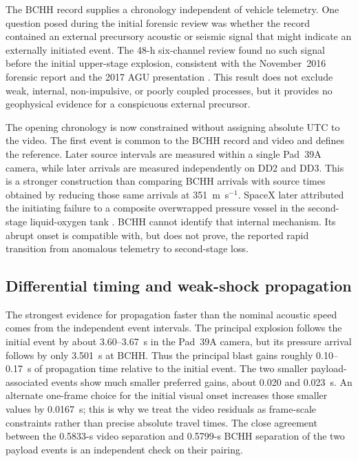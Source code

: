 \documentclass[]{seismica}
\begin{document}
The BCHH record supplies a chronology independent of vehicle telemetry. One
question posed during the initial forensic review was whether the record
contained an external precursory acoustic or seismic signal that might indicate
an externally initiated event. The 48-h six-channel review found no such signal
before the initial upper-stage explosion, consistent with the November~2016
forensic report \citep{thompson_mcnutt_fireball_2016} and the 2017 AGU
presentation \citep{thompson_agu_falcon9_2017}. This result does not exclude
weak, internal, non-impulsive, or poorly coupled processes, but it provides no
geophysical evidence for a conspicuous external precursor.

The opening chronology is now constrained without assigning absolute UTC to the
video. The first event is common to the BCHH record and video and defines the
reference. Later source intervals are measured within a single Pad~39A camera,
while later arrivals are measured independently on DD2 and DD3. This is a
stronger construction than comparing BCHH arrivals with source times obtained
by reducing those same arrivals at 351~m~s$^{-1}$. SpaceX later attributed the
initiating failure to a composite overwrapped pressure vessel in the
second-stage liquid-oxygen tank \citep{spacex_anomaly_2017,nasa_sma_falcon9}.
BCHH cannot identify that internal mechanism. Its abrupt onset is compatible
with, but does not prove, the reported rapid transition from anomalous telemetry
to second-stage loss.

\subsection{Differential timing and weak-shock propagation}

The strongest evidence for propagation faster than the nominal acoustic speed
comes from the independent event intervals. The principal explosion follows the
initial event by about 3.60--3.67~s in the Pad~39A camera, but its pressure
arrival follows by only 3.501~s at BCHH. Thus the principal blast gains roughly
0.10--0.17~s of propagation time relative to the initial event. The two smaller
payload-associated events show much smaller preferred gains, about 0.020 and
0.023~s. An alternate one-frame choice for the initial visual onset increases
those smaller values by 0.0167~s; this is why we treat the video residuals as
frame-scale constraints rather than precise absolute travel times. The close
agreement between the 0.5833-s video separation and 0.5799-s BCHH separation of
the two payload events is an independent check on their pairing.
\end{document}
